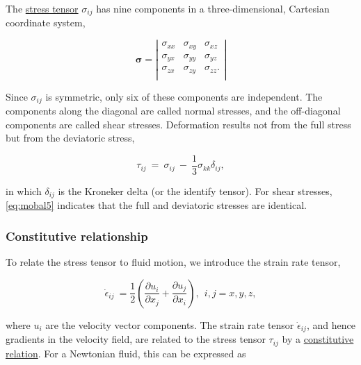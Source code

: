 The \href{http://en.wikipedia.org/wiki/Stress_tensor}{stress tensor} $\sigma_{ij}$ has nine components in a three-dimensional,
Cartesian coordinate system,

\begin{equation}
\mathbf{\sigma} =
\left\vert  \begin{array}{ccc} 
    \sigma _{ xx} & \sigma _{ xy} & \sigma _{ xz} \\
    \sigma _{ yx} & \sigma _{ yy} & \sigma _{ yz} \\
    \sigma _{ zx} & \sigma _{ zy} & \sigma _{ zz}. \\
\end{array} \right\vert 
\label{eq:mobal4}
\end{equation}

\noindent
Since $\sigma_{ij}$ is symmetric, only six of these components are independent.
The components along the diagonal are called normal stresses, and the off-diagonal components are called shear stresses. 
Deformation results not from the full stress but from the deviatoric stress,

\begin{equation}
\tau_{ ij} ~ = ~ \sigma _{ ij} ~ - ~{\frac{ 1}{ 3}} \sigma _{ kk} \delta _{ ij},
\label{eq:mobal5}
\end{equation}

\noindent
in which $\delta_{ ij}$ is the Kroneker delta (or the identify tensor). For shear stresses, \eqref{eq:mobal5} indicates that
the full and deviatoric stresses are identical.

\subsubsection{Constitutive relationship}

To relate the stress tensor to fluid motion, we introduce the strain rate tensor,

\begin{equation}
\dot{\epsilon}_{ij}~= \frac{1}{2}\left( \frac{ \partial u_{i}}{\partial x_{j}} + \frac{ \partial u_{j}}{\partial x_{i}}\right), ~~i,j = x,y,z,
\label{eq:mobal6}
\end{equation}

\noindent
where $u_i$ are the velocity vector components. The strain rate tensor $\dot{\epsilon}_{ij}$, and hence gradients in the 
velocity field, are related to the stress tensor $\tau_{ij}$ by a \href{http://en.wikipedia.org/wiki/Constitutive_equation}
{constitutive relation}. For a Newtonian fluid, this can be expressed as

